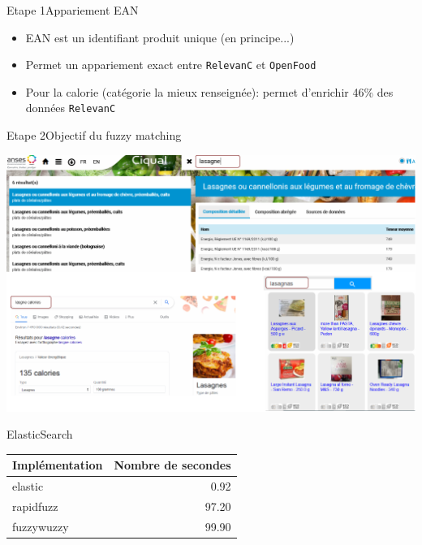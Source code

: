 \documentclass[ignorenonframetext,]{beamer}
\begin{document}
\begin{frame}{Etape 1}{Appariement EAN}

\begin{itemize}
    \item EAN est un identifiant produit unique (en principe...)
    \item Permet un appariement exact entre \texttt{RelevanC} et \texttt{OpenFood}
    \item Pour la calorie (catégorie la mieux renseignée): permet d'enrichir 46\% des données \texttt{RelevanC}
\end{itemize}
\end{frame}



\begin{frame}{Etape 2}{Objectif du fuzzy matching}

\includegraphics[width = \linewidth]{images/elastic-openfood-lasagnas.drawio.png}

\end{frame}

\begin{frame}{ElasticSearch}

\begin{tabular}{lr}
\toprule
{Implémentation} &  Nombre de secondes \\
\midrule
elastic    &            0.92 \\
rapidfuzz  &           97.20 \\
fuzzywuzzy &           99.90 \\
\bottomrule
\end{tabular}
    
\end{frame}
\end{document}
